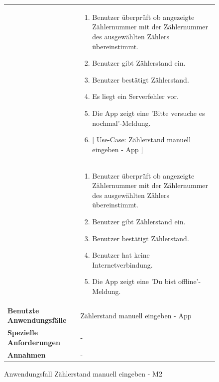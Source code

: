 
\begin{figure}[h]
	\centering
	\begin{tabularx}{\textwidth}{ X | X }
	&
		\begin{enumerate}
			\item Benutzer überprüft ob angezeigte Zählernummer mit der Zählernummer des ausgewählten Zählers übereinstimmt.
			\item Benutzer gibt Zählerstand ein.
			\item Benutzer bestätigt Zählerstand.
			\item Es liegt ein Serverfehler vor.
			\item Die App zeigt eine 'Bitte versuche es nochmal'-Meldung. 
			\item $\lbrack$ Use-Case: Zählerstand manuell eingeben - App $\rbrack$
		\end{enumerate} \\  &
		\begin{enumerate}
			\item Benutzer überprüft ob angezeigte Zählernummer mit der Zählernummer des ausgewählten Zählers übereinstimmt.
			\item Benutzer gibt Zählerstand ein.
			\item Benutzer bestätigt Zählerstand.
			\item Benutzer hat keine Internetverbindung.
			\item Die App zeigt eine 'Du bist offline'-Meldung.
		\end{enumerate}  \\ \hline
		\textbf{Benutzte Anwendungsfälle} & Zählerstand manuell eingeben - App \\ \hline
		\textbf{Spezielle Anforderungen} & - \\ \hline
		\textbf{Annahmen} & -
	\end{tabularx}
	\caption{Anwendungsfall Zählerstand manuell eingeben - M2}
	\label{fig:anwendungsfall-server-tabelle-xx-1}
\end{figure}

\newpage

